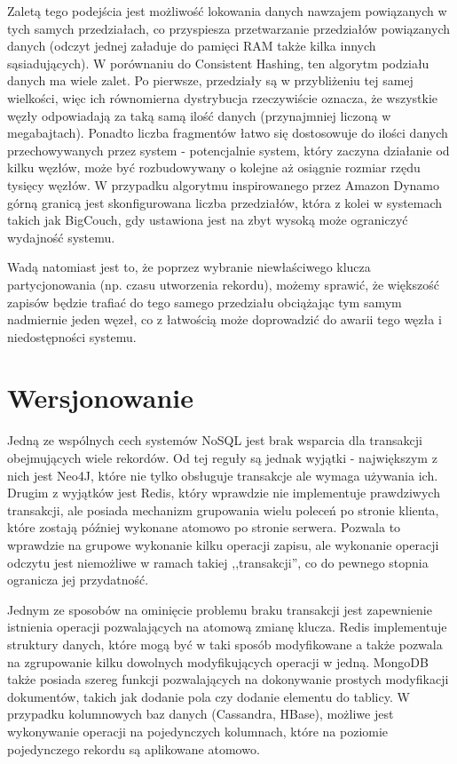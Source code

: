 Zaletą tego podejścia jest możliwość lokowania danych nawzajem powiązanych w tych samych przedziałach, co przyspiesza przetwarzanie przedziałów powiązanych danych (odczyt jednej załaduje do pamięci RAM także kilka innych sąsiadujących).
W porównaniu do Consistent Hashing, ten algorytm podziału danych ma wiele zalet.
Po pierwsze, przedziały są w przybliżeniu tej samej wielkości, więc ich równomierna dystrybucja rzeczywiście oznacza, że wszystkie węzły odpowiadają za taką samą ilość danych (przynajmniej liczoną w megabajtach).
Ponadto liczba fragmentów łatwo się dostosowuje do ilości danych przechowywanych przez system - potencjalnie system, który zaczyna działanie od kilku węzłów, może być rozbudowywany o kolejne aż osiągnie rozmiar rzędu tysięcy węzłów.
W przypadku algorytmu inspirowanego przez Amazon Dynamo górną granicą jest skonfigurowana liczba przedziałów, która z kolei w systemach takich jak BigCouch, gdy ustawiona jest na zbyt wysoką może ograniczyć wydajność systemu.

Wadą natomiast jest to, że poprzez wybranie niewłaściwego klucza partycjonowania (np. czasu utworzenia rekordu), możemy sprawić, że większość zapisów będzie trafiać do tego samego przedziału obciążając tym samym nadmiernie jeden węzeł, co z łatwością może doprowadzić do awarii tego węzła i niedostępności systemu.

\section{Wersjonowanie}

Jedną ze wspólnych cech systemów NoSQL jest brak wsparcia dla transakcji obejmujących wiele rekordów.
Od tej reguły są jednak wyjątki - największym z nich jest Neo4J, które nie tylko obsługuje transakcje ale wymaga używania ich.
Drugim z wyjątków jest Redis, który wprawdzie nie implementuje prawdziwych transakcji, ale posiada mechanizm grupowania wielu poleceń po stronie klienta, które zostają później wykonane atomowo po stronie serwera.
Pozwala to wprawdzie na grupowe wykonanie kilku operacji zapisu, ale wykonanie operacji odczytu jest niemożliwe w ramach takiej ,,transakcji'', co do pewnego stopnia ogranicza jej przydatność.

Jednym ze sposobów na ominięcie problemu braku transakcji jest zapewnienie istnienia operacji pozwalających na atomową zmianę klucza.
Redis implementuje struktury danych, które mogą być w taki sposób modyfikowane a także pozwala na zgrupowanie kilku dowolnych modyfikujących operacji w jedną.
MongoDB także posiada szereg funkcji pozwalających na dokonywanie prostych modyfikacji dokumentów, takich jak dodanie pola czy dodanie elementu do tablicy.
W przypadku kolumnowych baz danych (Cassandra, HBase), możliwe jest wykonywanie operacji na pojedynczych kolumnach, które na poziomie pojedynczego rekordu są aplikowane atomowo.

